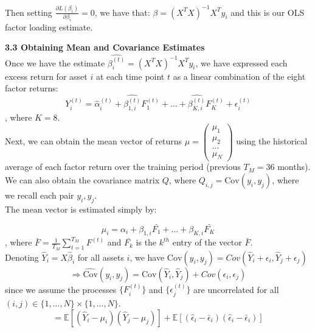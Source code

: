 \documentclass{article}
\begin{document}
Then setting $\frac{\partial L(\beta_i)}{\partial \beta_i} = 0$, we have that: $\beta = (X^TX)^{-1}X^Ty_i$ and this is our OLS factor loading estimate.\\

\vspace{5mm}

\textbf{3.3 Obtaining Mean and Covariance Estimates}\\

Once we have the estimate $\hat{\beta_i^{(t)}} = (X^TX)^{-1}X^Ty_i$, we have expressed each excess return for asset $i$ at each time point $t$ as a linear combination of the eight factor returns:\\

\[ Y_i^{(t)} = \hat{\alpha}_i^{(t)} + \hat{\beta_{1,i}^{(t)}}F_1^{(t)} + ... + \hat{\beta_{K,i}^{(t)}}F_K^{(t)} + \epsilon_i^{(t)} \], where $K=8$.\\

Next, we can obtain the mean vector of returns $\mu = \begin{pmatrix} \mu_1 \\
\mu_2\\
...\\
\mu_N \end{pmatrix} $ using the historical average of each factor return over the training period (previous $T_M=36$ months). We can also obtain the covariance matrix $Q$, where $Q_{i,j} = \text{Cov}(y_i,y_j)$, where we recall each pair $y_i,y_j$.\\

The mean vector is estimated simply by:

\[ \mu_i = \alpha_i + \beta_{1,i}\bar{F_1} + ... + \beta_{K,i}\bar{F_K} \], where $\bar{F} = \frac{1}{T_M}\sum_{t=1}^{T_M} F^{(t)}$ and $\bar{F_k}$ is the $k^{th}$ entry of the vector $\bar{F}$.\\

Denoting $\hat{Y}_i = X\hat{\beta}_i$ for all assets $i$, we have $\text{Cov}(y_i,y_j) = Cov(\hat{Y}_i + \epsilon_i, \hat{Y}_j + \epsilon_j)$\\

\[ \Rightarrow \hat{\text{Cov}}(y_i, y_j) = \text{Cov}(\hat{Y}_i, \hat{Y}_j) + Cov(\epsilon_i,\epsilon_j) \] since we assume the processes $\{F_i^{(t)}\}$ and $\{\epsilon_j^{(t)}\}$ are uncorrelated for all $(i,j) \in \{1,...,N\} \times \{1,...,N\}$.\\

\[= \mathbb{E}[(\hat{Y}_i - \mu_i)(\hat{Y}_j - \mu_j)] + \mathbb{E}[(\hat{\epsilon}_i - \bar{\epsilon}_i)(\hat{\epsilon}_i - \bar{\epsilon}_i)]\]\\
\end{document}
